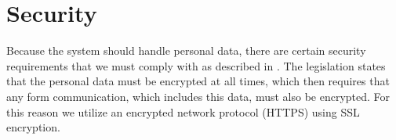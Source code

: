 
\chapter{Security}
\label{cha:security}

Because the system should handle personal data, there are certain security requirements that we must comply with as described in . The legislation states that the personal data must be encrypted at all times, which then requires that any form communication, which includes this data, must also be encrypted. For this reason we utilize an encrypted network protocol (HTTPS) using SSL encryption.




